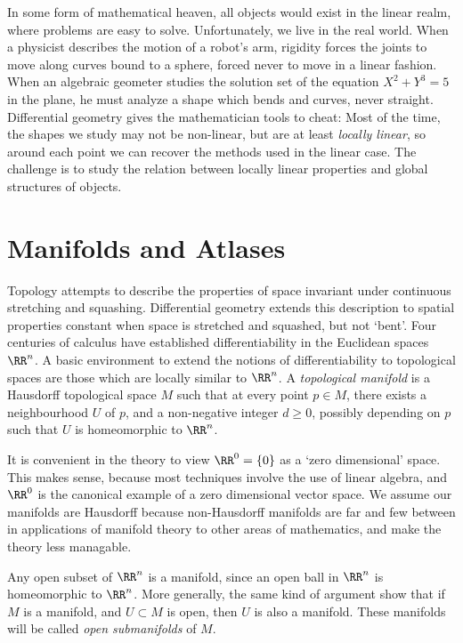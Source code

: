 In some form of mathematical heaven, all objects would exist in the linear realm, where problems are easy to solve. Unfortunately, we live in the real world.  When a physicist describes the motion of a robot's arm, rigidity forces the joints to move along curves bound to a sphere, forced never to move in a linear fashion. When an algebraic geometer studies the solution set of the equation $X^2 + Y^3 = 5$ in the plane, he must analyze a shape which bends and curves, never straight. Differential geometry gives the mathematician tools to cheat: Most of the time, the shapes we study may not be non-linear, but are at least {\it locally linear}, so around each point we can recover the methods used in the linear case. The challenge is to study the relation between locally linear properties and global structures of objects.

\section{Manifolds and Atlases}

Topology attempts to describe the properties of space invariant under continuous stretching and squashing. Differential geometry extends this description to spatial properties constant when space is stretched and squashed, but not `bent'. Four centuries of calculus have established differentiability in the Euclidean spaces $\RR^n$. A basic environment to extend the notions of differentiability to topological spaces are those which are locally similar to $\RR^n$. A \emph{topological manifold} is a Hausdorff topological space $M$ such that at every point $p \in M$, there exists a neighbourhood $U$ of $p$, and a non-negative integer $d \geq 0$, possibly depending on $p$ such that $U$ is homeomorphic to $\RR^n$.

\begin{remark}
    It is convenient in the theory to view $\RR^0 = \{ 0 \}$ as a `zero dimensional' space. This makes sense, because most techniques involve the use of linear algebra, and $\RR^0$ is the canonical example of a zero dimensional vector space. We assume our manifolds are Hausdorff because non-Hausdorff manifolds are far and few between in applications of manifold theory to other areas of mathematics, and make the theory less managable.
\end{remark}

\begin{example}
    Any open subset of $\RR^n$ is a manifold, since an open ball in $\RR^n$ is homeomorphic to $\RR^n$. More generally, the same kind of argument show that if $M$ is a manifold, and $U \subset M$ is open, then $U$ is also a manifold. These manifolds will be called \emph{open submanifolds} of $M$.
\end{example}


